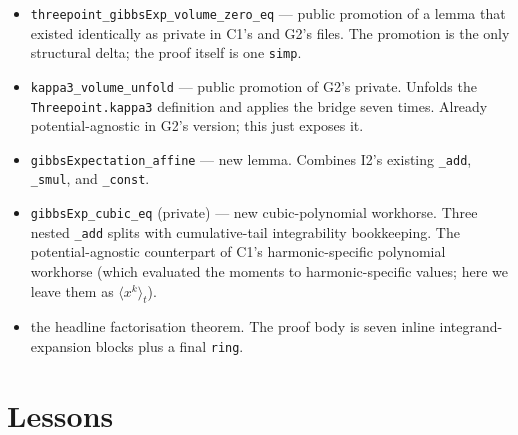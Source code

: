 \documentclass[11pt]{article}
\begin{document}
\begin{itemize}[leftmargin=1em,itemsep=0.2em]
\item \texttt{threepoint\_gibbsExp\_volume\_zero\_eq} — public
  promotion of a lemma that existed identically as private in C1's
  and G2's files. The promotion is the only structural delta;
  the proof itself is one \texttt{simp}.
\item \texttt{kappa3\_volume\_unfold} — public promotion of G2's
  private. Unfolds the \texttt{Threepoint.kappa3} definition and
  applies the bridge seven times. Already potential-agnostic in G2's
  version; this just exposes it.
\item \texttt{gibbsExpectation\_affine} — new lemma. Combines I2's
  existing \texttt{\_add}, \texttt{\_smul}, and \texttt{\_const}.
\item \texttt{gibbsExp\_cubic\_eq} (private) — new cubic-polynomial
  workhorse. Three nested \texttt{\_add} splits with cumulative-tail
  integrability bookkeeping. The potential-agnostic counterpart of
  C1's harmonic-specific polynomial workhorse (which evaluated the
  moments to harmonic-specific values; here we leave them as
  $\langle x^k \rangle_t$).
\item the headline factorisation theorem. The proof body is seven
  inline integrand-expansion blocks plus a final \texttt{ring}.
\end{itemize}

\section{Lessons}
\end{document}
